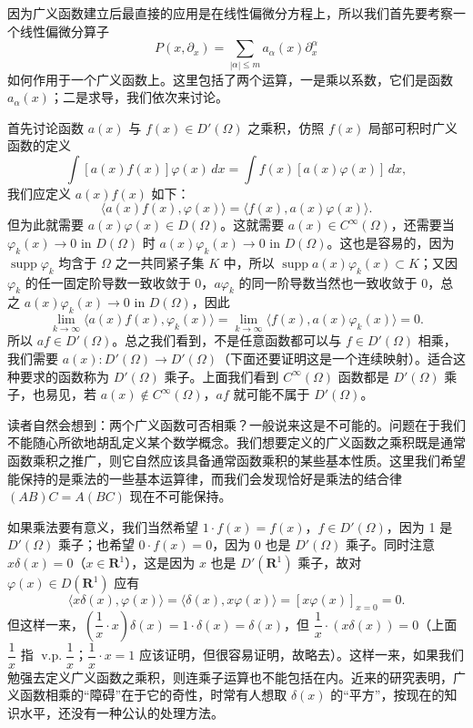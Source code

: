 因为广义函数建立后最直接的应用是在线性偏微分方程上，所以我们首先要考察一个线性偏微分算子
\[
 P(x,\partial_x)=\sum_{|\alpha|\le m}a_\alpha(x)\partial_x^\alpha
\]
如何作用于一个广义函数上。这里包括了两个运算，一是乘以系数，它们是函数 $a_\alpha(x)$；二是求导，我们依次来讨论。

首先讨论函数 $a(x)$ 与 $f(x)\in D'(\Omega)$ 之乘积，仿照 $f(x)$ 局部可积时广义函数的定义
\[
 \int[a(x)f(x)]\varphi(x)\,dx=\int f(x)[a(x)\varphi(x)]\,dx,
\]
我们应定义 $a(x)f(x)$ 如下：
\begin{equation}
 \langle a(x)f(x),\varphi(x)\rangle
 =\langle f(x),a(x)\varphi(x)\rangle.
 \tag{21}
\end{equation}
但为此就需要 $a(x)\varphi(x)\in D(\Omega)$。这就需要 $a(x)\in C^\infty(\Omega)$，还需要当 $\varphi_k(x)\to0$ in $D(\Omega)$ 时 $a(x)\varphi_k(x)\to0$ in $D(\Omega)$。这也是容易的，因为 $\operatorname{supp}\varphi_k$ 均含于 $\Omega$ 之一共同紧子集 $K$ 中，所以 $\operatorname{supp}a(x)\varphi_k(x)\subset K$；又因 $\varphi_k$ 的任一固定阶导数一致收敛于 0，$a\varphi_k$ 的同一阶导数当然也一致收敛于 0，总之 $a(x)\varphi_k(x)\to0$ in $D(\Omega)$，因此
\[
 \lim_{k\to\infty}\langle a(x)f(x),\varphi_k(x)\rangle
 =\lim_{k\to\infty}\langle f(x),a(x)\varphi_k(x)\rangle=0.
\]
所以 $af\in D'(\Omega)$。总之我们看到，不是任意函数都可以与 $f\in D'(\Omega)$ 相乘，我们需要 $a(x):D'(\Omega)\to D'(\Omega)$（下面还要证明这是一个连续映射）。适合这种要求的函数称为 $D'(\Omega)$ 乘子。上面我们看到 $C^\infty(\Omega)$ 函数都是 $D'(\Omega)$ 乘子，也易见，若 $a(x)\notin C^\infty(\Omega)$，$af$ 就可能不属于 $D'(\Omega)$。

读者自然会想到：两个广义函数可否相乘？一般说来这是不可能的。问题在于我们不能随心所欲地胡乱定义某个数学概念。我们想要定义的广义函数之乘积既是通常函数乘积之推广，则它自然应该具备通常函数乘积的某些基本性质。这里我们希望能保持的是乘法的一些基本运算律，而我们会发现恰好是乘法的结合律 $(AB)C=A(BC)$ 现在不可能保持。

如果乘法要有意义，我们当然希望 $1\cdot f(x)=f(x)$，$f\in D'(\Omega)$，因为 1 是 $D'(\Omega)$ 乘子；也希望 $0\cdot f(x)=0$，因为 0 也是 $D'(\Omega)$ 乘子。同时注意 $x\delta(x)=0$（$x\in\mathbf R^1$），这是因为 $x$ 也是 $D'(\mathbf R^1)$ 乘子，故对 $\varphi(x)\in D(\mathbf R^1)$ 应有
\[
 \langle x\delta(x),\varphi(x)\rangle
 =\langle\delta(x),x\varphi(x)\rangle
 =[x\varphi(x)]_{x=0}=0.
\]
但这样一来，$\left(\dfrac1x\cdot x\right)\delta(x)=1\cdot\delta(x)=\delta(x)$，但 $\dfrac1x\cdot(x\delta(x))=0$（上面 $\dfrac1x$ 指 $\operatorname{v.p.}\dfrac1x$；$\dfrac1x\cdot x=1$ 应该证明，但很容易证明，故略去）。这样一来，如果我们勉强去定义广义函数之乘积，则连乘子运算也不能包括在内。近来的研究表明，广义函数相乘的“障碍”在于它的奇性，时常有人想取 $\delta(x)$ 的“平方”，按现在的知识水平，还没有一种公认的处理方法。

